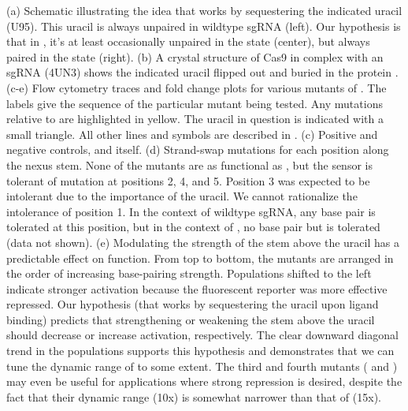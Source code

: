 \documentclass[10pt,oneside]{article}
\begin{document}



    (a) Schematic illustrating the idea that \ligrnaB{} works by sequestering the indicated uracil (U95).  This uracil is always unpaired in wildtype sgRNA (left).  Our hypothesis is that in \ligrnaB{}, it's at least occasionally unpaired in the \apo{} state (center), but always paired in the \holo{} state (right).
    (b) A crystal structure of Cas9 in complex with an sgRNA (4UN3) shows the indicated uracil flipped out and buried in the protein \autocite{nishimasu2014}.
    (c-e) Flow cytometry traces and fold change plots for various mutants of \ligrnaB{}.  The labels give the sequence of the particular mutant being tested.  Any mutations relative to \ligrnaB{} are highlighted in yellow.  The uracil in question is indicated with a small triangle.  All other lines and symbols are described in .
    (c) Positive and negative controls, and \ligrnaB{} itself.
    (d) Strand-swap mutations for each position along the nexus stem.  None of the mutants are as functional as \ligrnaB{}, but the sensor is tolerant of mutation at positions 2, 4, and 5.  Position 3 was expected to be intolerant due to the importance of the uracil.  We cannot rationalize the intolerance of position 1.  In the context of wildtype sgRNA, any base pair is tolerated at this position, but in the context of \ligrnaB{}, no base pair but  is tolerated (data not shown).
    (e) Modulating the strength of the stem above the uracil has a predictable effect on function.  From top to bottom, the mutants are arranged in the order of increasing base-pairing strength.  Populations shifted to the left indicate stronger activation because the fluorescent reporter was more effective repressed.  Our hypothesis (that \ligrnaB{} works by sequestering the uracil upon ligand binding) predicts that strengthening or weakening the stem above the uracil should decrease or increase activation, respectively.  The clear downward diagonal trend in the populations supports this hypothesis and demonstrates that we can tune the dynamic range of \ligrnaB{} to some extent.  The third and fourth mutants ( and ) may even be useful for applications where strong repression is desired, despite the fact that their dynamic range (10x) is somewhat narrower than that of \ligrnaB{} (15x).

\end{document}

